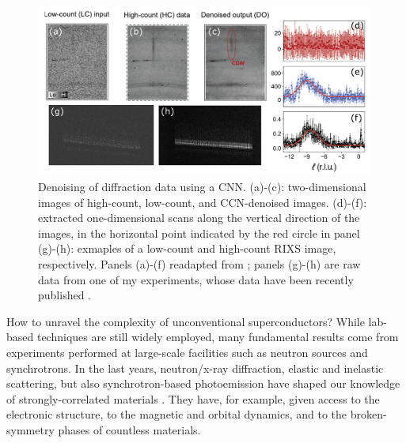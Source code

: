 \documentclass[a4paper, 12pt]{article}
\begin{document}
\medskip

%
\begin{figure}
    \centering
    \includegraphics[width=0.99\textwidth]{ML5.pdf}
    \caption{Denoising of diffraction data using a CNN. (a)-(c): two-dimensional images of high-count, low-count, and CCN-denoised images. (d)-(f): extracted one-dimensional scans along the vertical direction of the images, in the horizontal point indicated by the red circle in panel (g)-(h): exmaples of a low-count and high-count RIXS image, respectively. Panels (a)-(f) readapted from \cite{oppliger2022weak}; panels (g)-(h) are raw data from one of my experiments, whose data have been recently published \cite{martinelli2022fractional}.}
    \label{fig:ML}
\end{figure}
%
How to unravel the complexity of unconventional superconductors? While lab-based techniques are still widely employed, many fundamental results come from experiments performed at large-scale facilities such as neutron sources and synchrotrons. In the last years, neutron/x-ray diffraction, elastic and inelastic scattering, but also synchrotron-based photoemission have shaped our knowledge of strongly-correlated materials \cite{keimer2015quantum}. 
They have, for example, given access to the electronic structure, to the magnetic and orbital dynamics, and to the broken-symmetry phases of countless materials.
\end{document}

